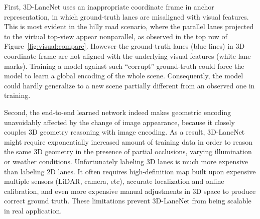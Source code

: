 \documentclass[10pt,twocolumn,letterpaper]{article}
\begin{document}
First, 3D-LaneNet uses an inappropriate coordinate frame in anchor representation, in which ground-truth lanes are misaligned with visual features. This is most evident in the hilly road scenario, where the parallel lanes projected to the virtual top-view appear nonparallel, as observed in the top row of Figure~\ref{fig:visual:compare}. However the ground-truth lanes (blue lines) in 3D coordinate frame are not aligned with the underlying visual features (white lane marks). Training a model against such ``corrupt'' ground-truth could force the model to learn a global encoding of the whole scene. Consequently, the model could hardly generalize to a new scene partially different from an observed one in training.

\begin{comment}
To further demonstrate this fact in feature level, we visualize features from a set of key layers, as shown in Figure~\ref{fig:feat:vis}. Observe that, top-view features produced by~\cite{Garnett:etal:ICCV2019} are indeed not aligned with 3D lane coordinates.

\begin{figure}[!h]
  \centering
\texttt{[image: figs/feat\_exp\_img.png]}
  \texttt{[image: figs/feat\_exp\_top1.png]}
  \texttt{[image: figs/feat\_exp\_top2.png]}
  \texttt{[image: figs/feat\_exp\_top3.png]}
\caption{\textbf{3D-LaneNet feature visualization:} Given an image captured on a uphill road, imaged lanes are suppose to appear diverging when projected to the virtual top-view. As observed from the visualized features from those blue-marked layers in Figure~\ref{fig:3DLaneNet:Arch}(a), \textbf{top-view features} also form diverging lines. Consequently, diverging visual features will not be in alignment with the parallel lane lines prepared as ground-truth.}
  \label{fig:feat:vis}
\end{figure}
\end{comment}


Second, the end-to-end learned network indeed makes geometric encoding unavoidably affected by the change of image appearance, because it closely couples 3D geometry reasoning with image encoding. As a result, 3D-LaneNet might require exponentially increased amount of training data in order to reason the same 3D geometry in the presence of partial occlusions, varying illumination or weather conditions. Unfortunately labeling 3D lanes is much more expensive than labeling 2D lanes. It often requires high-definition map built upon expensive multiple sensors (LiDAR, camera, etc), accurate localization and online calibration, and even more expensive manual adjustments in 3D space to produce correct ground truth. These limitations prevent 3D-LaneNet from being scalable in real application. 
\end{document}
